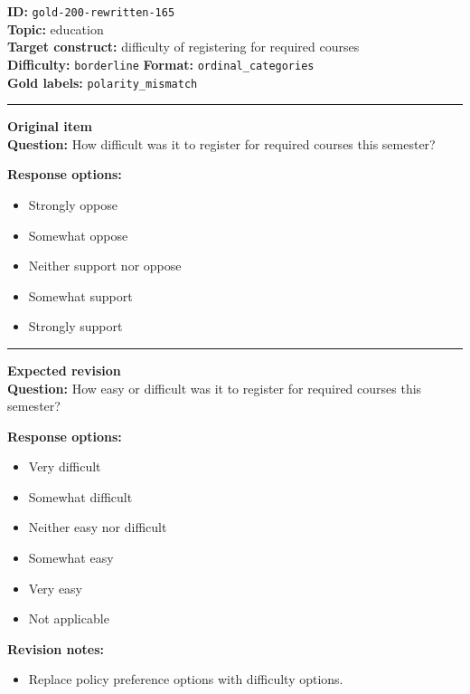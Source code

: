 \documentclass[10pt,a4paper]{article}
\newcommand{\sectionline}{\vspace{0.15em}\hrule\vspace{0.35em}}
\begin{document}
\begin{tcolorbox}[colframe=FlawRed,colback=white,colbacktitle=FlawRed!9,coltitle=black,title={Item 165\hfill Flawed item}]
\textbf{ID:} \texttt{gold-200-rewritten-165}\\
\textbf{Topic:} education\\
\textbf{Target construct:} difficulty of registering for required courses\\
\textbf{Difficulty:} \texttt{borderline} \quad \textbf{Format:} \texttt{ordinal\_categories}\\
\textbf{Gold labels:} \texttt{polarity\_mismatch}\\
\sectionline
\textbf{Original item}\\
\textbf{Question:} How difficult was it to register for required courses this semester?
\par\textbf{Response options:}
\begin{itemize}
\item Strongly oppose
\item Somewhat oppose
\item Neither support nor oppose
\item Somewhat support
\item Strongly support
\end{itemize}
\sectionline
\textbf{Expected revision}\\
\textbf{Question:} How easy or difficult was it to register for required courses this semester?
\par\textbf{Response options:}
\begin{itemize}
\item Very difficult
\item Somewhat difficult
\item Neither easy nor difficult
\item Somewhat easy
\item Very easy
\item Not applicable
\end{itemize}
\par\textbf{Revision notes:}
\begin{itemize}
\item Replace policy preference options with difficulty options.
\end{itemize}
\end{tcolorbox}
\end{document}
